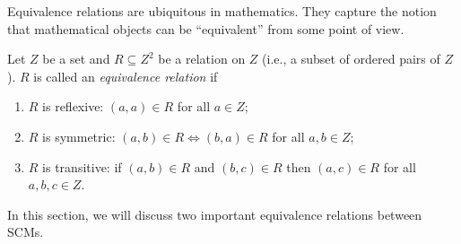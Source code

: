 Equivalence relations are ubiquitous in mathematics. They capture the notion that mathematical objects can be ``equivalent'' 
from some point of view.
\begin{Def}
  Let $Z$ be a set and $R \subseteq Z^2$ be a relation on $Z$ (i.e., a subset of ordered pairs of $Z$). $R$ is called an \emph{equivalence relation} if 
  \begin{enumerate}
    \item $R$ is reflexive: $(a,a) \in R$ for all $a \in Z$;
    \item $R$ is symmetric: $(a,b) \in R \iff (b,a) \in R$ for all $a,b \in Z$;
    \item $R$ is transitive: if $(a,b) \in R$ and $(b,c) \in R$ then $(a,c) \in R$ for all $a,b,c\in Z$.
  \end{enumerate}
\end{Def}
In this section, we will discuss two important equivalence relations between SCMs.
